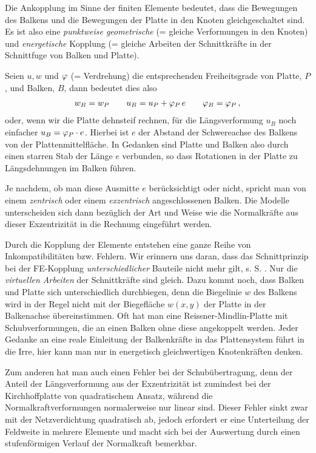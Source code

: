 Die Ankopplung im Sinne der finiten Elemente bedeutet, dass die Bewegungen des Balkens und die Bewegungen der Platte in den Knoten gleichgeschaltet sind. Es ist also eine {\em punktweise geometrische\/} (= gleiche Verformungen in den Knoten) und {\em energetische\/} Kopplung (= gleiche Arbeiten der Schnittkr\"{a}fte in der Schnittfuge von Balken und Platte).

Seien $u, w$ und $\varphi$ (= Verdrehung) die entsprechenden Freiheitsgrade von Platte, $P$, und Balken, $B$, dann bedeutet dies  also
\begin{align}
w_B = w_P \qquad u_B = u_P + \varphi_P\,e \qquad \varphi_B = \varphi_P\,,
\end{align}
oder, wenn wir die Platte dehnsteif rechnen, f\"{u}r die L\"{a}ngsverformung $u_B$ noch einfacher $u_B = \varphi_P \cdot e$. Hierbei ist $e$ der Abstand der Schwereachse des Balkens von der Plattenmittelfl\"{a}che. In Gedanken sind Platte und Balken also durch einen starren Stab der L\"{a}nge $e$ verbunden, so dass Rotationen in der Platte zu L\"{a}ngsdehnungen im Balken f\"{u}hren.

Je nachdem, ob man diese Ausmitte $e$ ber\"{u}cksichtigt oder nicht, spricht man von einem {\em zentrisch\/} oder einem {\em exzentrisch\/} angeschlossenen Balken. Die Modelle unterscheiden sich dann bez\"{u}glich der Art und Weise wie die Normalkr\"{a}fte aus dieser Exzentrizit\"{a}t in die Rechnung eingef\"{u}hrt werden.

Durch die Kopplung der Elemente entstehen eine ganze Reihe von Inkompatibilit\"{a}ten bzw. Fehlern. Wir erinnern uns daran, dass das Schnittprinzip bei der FE-Kopplung {\em unterschiedlicher\/} Bauteile nicht mehr gilt, s. S. \pageref{Schnittprinzip}. Nur die {\em virtuellen Arbeiten\/} der Schnittkr\"{a}fte sind gleich. Dazu kommt noch, dass Balken und Platte sich unterschiedlich durchbiegen, denn die Biegelinie $w$ des Balkens wird in der Regel nicht mit der Biegefl\"{a}che $w(x,y)$ der Platte in der Balkenachse \"{u}bereinstimmen. Oft hat man eine Reissner-Mindlin-Platte mit Schubverformungen, die an einen Balken ohne diese angekoppelt werden. Jeder Gedanke an eine reale Einleitung der Balkenkr\"{a}fte in das Plattensystem f\"{u}hrt in die Irre, hier kann man nur in energetisch gleichwertigen Knotenkr\"{a}ften denken.

Zum anderen hat man auch einen Fehler bei der Schub\"{u}bertragung, denn der Anteil der L\"{a}ngsverformung aus der Exzentrizit\"{a}t ist zumindest bei der Kirchhoffplatte von quadratischem Ansatz, w\"{a}hrend die Normalkraftverformungen normalerweise nur linear sind. Dieser Fehler sinkt zwar mit der Netzverdichtung quadratisch ab, jedoch erfordert er eine Unterteilung der Feldweite in mehrere Elemente und macht sich bei der Auswertung durch einen stufenf\"{o}rmigen Verlauf der Normalkraft bemerkbar.


